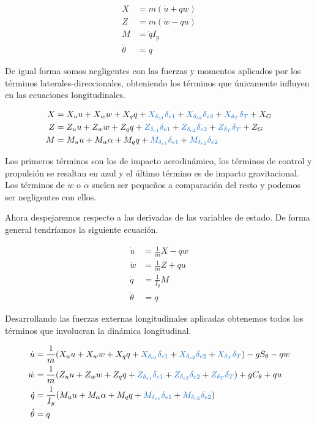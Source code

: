 \begin{align} 
X &= m (\dot u + qw) \\
Z &= m (\dot w - qu) \\
M &=  \dot q I_{y} \\
\dot \theta &= q
\end{align}

De igual forma somos negligentes con las fuerzas y momentos aplicados por los términos laterales-direccionales, obteniendo los términos que únicamente influyen en las ecuaciones longitudinales. 

\begin{align}
    X &= X_u u + X_w w  + X_q q + \textcolor{RoyalBlue}{X_{\delta_{e1}} \delta_{e1}}  + \textcolor{RoyalBlue}{X_{\delta_{e2}} \delta_{e2}}+ \textcolor{RoyalBlue}{X_{\delta_{T}} \delta_{T}} + X_G  \\
    Z &= Z_u u + Z_w w + Z_q q + \textcolor{RoyalBlue}{Z_{\delta_{e1}} \delta_{e1}}  + \textcolor{RoyalBlue}{Z_{\delta_{e2}} \delta_{e2}} + \textcolor{RoyalBlue}{Z_{\delta_{T}} \delta_{T}} + Z_G  \\
    M &= M_u u + M_\alpha \alpha + M_q q + \textcolor{RoyalBlue}{M_{\delta_{e1}} \delta_{e1}}  + \textcolor{RoyalBlue}{M_{\delta_{e2}} \delta_{e2}}
\end{align}

Los primeros términos son los de impacto aerodinámico, los términos de control y propulsión se resaltan en azul y el último término es de impacto gravitacional. Los términos de $\dot w$ o $\dot \alpha$ suelen ser pequeños a comparación del resto y podemos ser negligentes con ellos. 

Ahora despejaremos respecto a las derivadas de las variables de estado. 
De forma general tendríamos la siguiente ecuación. 

\begin{align} 
\dot u &= \frac{1}{m}X - qw \\
\dot w &= \frac{1}{m}Z + qu \\
\dot q &= \frac{1}{I_{y}}M   \\
\dot \theta &= q
\end{align}

Desarrollando las fuerzas externas longitudinales aplicadas obtenemos todos los términos que involucran la dinámica longitudinal. 

\begin{align} 
\label{eq: modelo longitudinal w}
\dot u &= \frac{1}{m}(X_u u + X_w w + X_q q + \textcolor{RoyalBlue}{X_{\delta_{e1}} \delta_{e1}}  + \textcolor{RoyalBlue}{X_{\delta_{e2}} \delta_{e2}}+ \textcolor{RoyalBlue}{X_{\delta_{T}} \delta_{T}}) - g S_{\theta} - qw \\
\dot w &= \frac{1}{m}(Z_u u + Z_w w + Z_q q + \textcolor{RoyalBlue}{Z_{\delta_{e1}} \delta_{e1}}  + \textcolor{RoyalBlue}{Z_{\delta_{e2}} \delta_{e2}} + \textcolor{RoyalBlue}{Z_{\delta_{T}} \delta_{T}}) + g C_{\theta} + qu \\
\dot q &= \frac{1}{I_{y}}(M_u u + M_\alpha \alpha + M_q q + \textcolor{RoyalBlue}{M_{\delta_{e1}} \delta_{e1}}  + \textcolor{RoyalBlue}{M_{\delta_{e2}} \delta_{e2}})  \\
\dot \theta &= q
\end{align}

